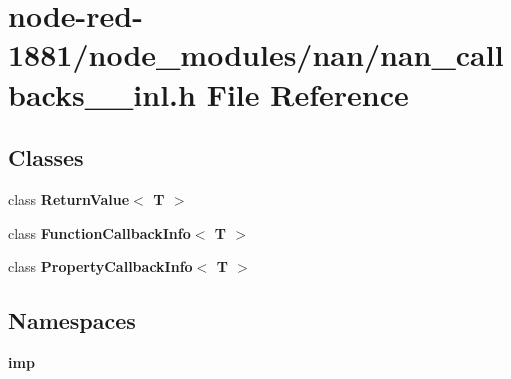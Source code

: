 \section{node-\/red-\/1881/node\+\_\+modules/nan/nan\+\_\+callbacks\+\_\+\_\+inl.h File Reference}
\label{nan__callbacks__12__inl_8h}
\subsection*{Classes}
\begin{DoxyCompactItemize}
\item 
class \textbf{ Return\+Value$<$ T $>$}
\item 
class \textbf{ Function\+Callback\+Info$<$ T $>$}
\item 
class \textbf{ Property\+Callback\+Info$<$ T $>$}
\end{DoxyCompactItemize}
\subsection*{Namespaces}
\begin{DoxyCompactItemize}
\item 
 \textbf{ imp}
\end{DoxyCompactItemize}
